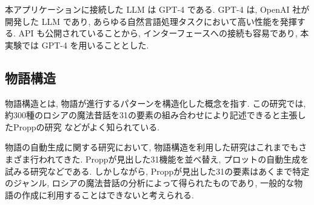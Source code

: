 


本アプリケーションに接続した LLM は GPT-4\cite{ref:OpenAI23} である. GPT-4 は, OpenAI 社が開発した LLM であり, あらゆる自然言語処理タスクにおいて高い性能を発揮する\cite{ref:OpenAI23}. API も公開されていることから, インターフェースへの接続も容易であり, 本実験では GPT-4 を用いることとした.

\subsection{物語構造}
物語構造とは, 物語が進行するパターンを構造化した概念を指す. この研究では, 約300種のロシアの魔法昔話を31の要素の組み合わせにより記述できると主張したProppの研究\cite{ref:Propp64} などがよく知られている. 


物語の自動生成に関する研究において, 物語構造を利用した研究はこれまでもさまざま行われてきた. Proppが見出した31機能を並べ替え, プロットの自動生成を試みる研究\cite{ref:Jaya11}などである. しかしながら, Proppが見出した31の要素はあくまで特定のジャンル, ロシアの魔法昔話の分析によって得られたものであり, 一般的な物語の作成に利用することはできないと考えられる. 

